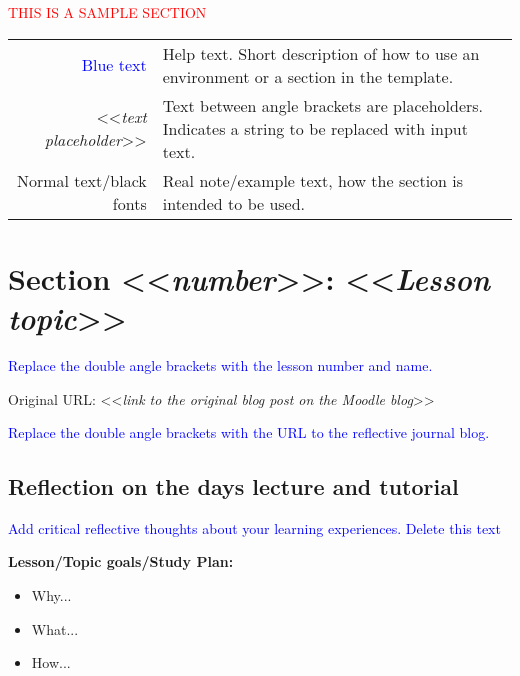 

{\begin{center}
    \textcolor{red}{\Huge{THIS IS A SAMPLE SECTION}}

    \begin{tabular}{r @{: } p{80mm}}
        {\textcolor{blue}{Blue text}} &  Help text. Short description of how to use an environment or a section in the template.\\
        <<{\emph{text placeholder}}>> & Text between angle brackets are placeholders. Indicates a string to be replaced with input text.\\
        Normal text/black fonts & Real note/example text, how the section is intended to be used.
    \end{tabular}

\end{center}


\section{Section <<{\emph{number}}>>: <<{\emph{Lesson topic}}>>}

{\textcolor{blue}{Replace the double angle brackets with the lesson number and name.}}

Original URL: <<{\emph{link to the original blog post on the Moodle blog}}>>

{\textcolor{blue}{Replace the double angle brackets with the URL to the reflective journal blog.}}


\subsection{Reflection on the days lecture and tutorial}

{\textcolor{blue}{Add critical reflective thoughts about your learning experiences. Delete this text}}

{\bfseries{Lesson/Topic goals/Study Plan:}}
\begin{itemize}
    \item Why...
    \item What...
    \item How...
\end{itemize}

}
